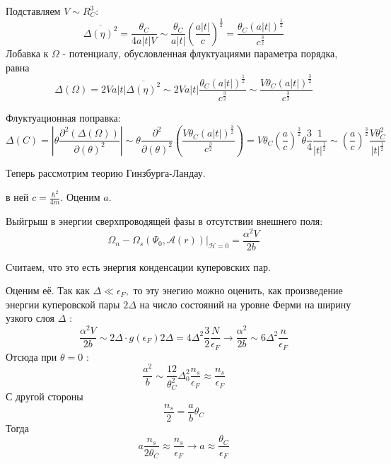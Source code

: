 \documentclass[a4paper,12pt]{article} %
\begin{document}
\begin{ttask}
Подставляем $V \sim R_{C}^{3}:$
$$
\overline{\Delta(\eta)^{2}}=\frac{\theta_{C}}{4 a|t| V} \sim \frac{\theta_{C}}{a|t|}\left(\frac{a|t|}{c}\right)^{\frac{3}{2}}=\frac{\theta_{C}(a|t|)^{\frac{1}{2}}}{c^{\frac{3}{2}}}
$$
Лобавка к $\Omega$ - потенциалу, обусловленная флуктуациями параметра порядка, равна
$$
\Delta(\Omega)=2 V a|t| \overline{\Delta(\eta)^{2}} \sim 2 V a|t| \frac{\theta_{C}(a|t|)^{\frac{1}{2}}}{c^{\frac{3}{2}}} \sim \frac{V \theta_{C}(a|t|)^{\frac{3}{2}}}{c^{\frac{3}{2}}}
$$




Флуктуационная поправка:
$$
\Delta(C)=\left|\theta \frac{\partial^{2}(\Delta(\Omega))}{\partial(\theta)^{2}}\right| \sim \theta \frac{\partial^{2}}{\partial(\theta)^{2}}\left(\frac{V \theta_{C}(a|t|)^{\frac{3}{2}}}{c^{\frac{3}{2}}}\right)=V \theta_{C}\left(\frac{a}{c}\right)^{\frac{3}{2}} \theta \frac{3}{4} \frac{1}{|t|^{\frac{1}{2}}} \sim\left(\frac{a}{c}\right)^{\frac{3}{2}} \frac{V \theta_{C}^{2}}{|t|^{\frac{1}{2}}}
$$








Теперь рассмотрим теорию Гинзбурга-Ландау.



в ней $c=\frac{\hbar^{2}}{4 m}$. Оценим $a$. 

Выйгрыш в энергии сверхпроводящей фазы в отсутствии внешнего поля:
$$
\Omega_{n}-\left.\Omega_{s}\left(\Psi_{0}, \mathcal{A}(r)\right)\right|_{\mathcal{H}=0}=\frac{\alpha^{2} V}{2 b}
$$


Считаем, что это есть энергия конденсации куперовских пар. 


Оценим её. Так как $\Delta \ll \epsilon_{F},$ то эту энегию можно оценить, как произведение энергии куперовской пары $2 \Delta$ на число состояний на уровне Ферми на ширину узкого слоя $\Delta$ :
$$
\frac{\alpha^{2} V}{2 b} \sim 2 \Delta \cdot g\left(\epsilon_{F}\right) 2 \Delta=4 \Delta^{2} \frac{3}{2} \frac{N}{\epsilon_{F}} \rightarrow \frac{\alpha^{2}}{2 b} \sim 6 \Delta^{2} \frac{n}{\epsilon_{F}}
$$
Отсюда при $\theta=0$ :
$$
\frac{a^{2}}{b} \sim \frac{12}{\theta_{C}^{2}} \Delta_{0}^{2} \frac{n_{s}}{\epsilon_{F}} \approx \frac{n_{s}}{\epsilon_{F}}
$$
С другой стороны
$$
\frac{n_{s}}{2}=\frac{a}{b} \theta_{C}
$$
Тогда
$$
a \frac{n_{s}}{2 \theta_{C}} \approx \frac{n_{s}}{\epsilon_{F}} \rightarrow a \approx \frac{\theta_{C}}{\epsilon_{F}}
$$







\end{ttask}
\end{document}
